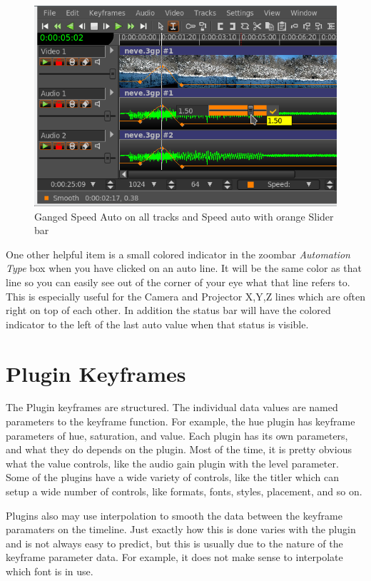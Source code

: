 \begin{figure}[htpb]
    \centering
    \includegraphics[width=0.8\linewidth]{images/speed.png}
    \caption{Ganged Speed Auto on all tracks and Speed auto with orange Slider bar}
    \label{fig:speed}
\end{figure}

One other helpful item is a small colored indicator in the zoombar \textit{Automation Type} box when you have clicked on an auto line.  It will be the same color as that line so you can easily see out of the corner of your eye what that line refers to.  This is especially useful for the Camera and Projector X,Y,Z lines which are often right on top of each other.  In addition the status bar will have the colored indicator to the left of the last auto value when that status is visible.

\section{Plugin Keyframes}%
\label{sec:plugin_keyframe}

The Plugin keyframes are structured.  The individual data values are named parameters to the keyframe function.  For example, the hue plugin has keyframe parameters of hue, saturation, and value.  Each plugin has its own parameters, and what they do depends on the plugin.  Most of the time, it is pretty obvious what the value controls, like the audio gain plugin with the level parameter.  Some of the plugins have a wide variety of controls, like the titler which can setup a wide number of controls, like formats, fonts, styles, placement, and so on.

Plugins also may use interpolation to smooth the data between the keyframe paramaters on the timeline.  Just exactly how this is done varies with the plugin and is not always easy to predict, but this
is usually due to the nature of the keyframe parameter data.  For example, it does not make sense to interpolate which font is in use.

